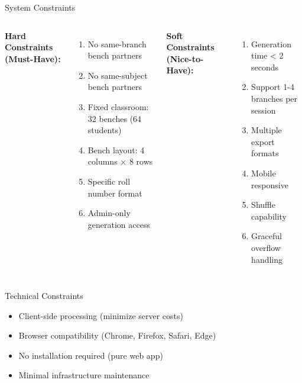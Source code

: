 \documentclass[aspectratio=169]{beamer}
\begin{document}
\begin{frame}{System Constraints}
\begin{columns}
\textbf{Hard Constraints (Must-Have):}
\begin{enumerate}
    \item No same-branch bench partners
    \item No same-subject bench partners
    \item Fixed classroom: 32 benches (64 students)
    \item Bench layout: 4 columns × 8 rows
    \item Specific roll number format
    \item Admin-only generation access
\end{enumerate}

\textbf{Soft Constraints (Nice-to-Have):}
\begin{enumerate}
    \item Generation time < 2 seconds
    \item Support 1-4 branches per session
    \item Multiple export formats
    \item Mobile responsive
    \item Shuffle capability
    \item Graceful overflow handling
\end{enumerate}
\end{columns}

\vspace{0.5cm}
\begin{block}{Technical Constraints}
\begin{itemize}
    \item Client-side processing (minimize server costs)
    \item Browser compatibility (Chrome, Firefox, Safari, Edge)
    \item No installation required (pure web app)
    \item Minimal infrastructure maintenance
\end{itemize}
\end{block}
\end{frame}
\end{document}
